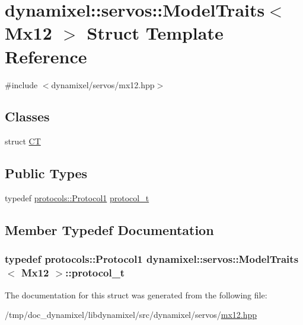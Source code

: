 \hypertarget{structdynamixel_1_1servos_1_1_model_traits_3_01_mx12_01_4}{}\section{dynamixel\+:\+:servos\+:\+:Model\+Traits$<$ Mx12 $>$ Struct Template Reference}
\label{structdynamixel_1_1servos_1_1_model_traits_3_01_mx12_01_4}


{\ttfamily \#include $<$dynamixel/servos/mx12.\+hpp$>$}

\subsection*{Classes}
\begin{DoxyCompactItemize}
\item 
struct \hyperlink{structdynamixel_1_1servos_1_1_model_traits_3_01_mx12_01_4_1_1_c_t}{C\+T}
\end{DoxyCompactItemize}
\subsection*{Public Types}
\begin{DoxyCompactItemize}
\item 
typedef \hyperlink{classdynamixel_1_1protocols_1_1_protocol1}{protocols\+::\+Protocol1} \hyperlink{structdynamixel_1_1servos_1_1_model_traits_3_01_mx12_01_4_a6bf24d609897d873140d1842e725fd47}{protocol\+\_\+t}
\end{DoxyCompactItemize}


\subsection{Member Typedef Documentation}
\hypertarget{structdynamixel_1_1servos_1_1_model_traits_3_01_mx12_01_4_a6bf24d609897d873140d1842e725fd47}{}
\subsubsection[{protocol\+\_\+t}]{\setlength{\rightskip}{0pt plus 5cm}typedef {\bf protocols\+::\+Protocol1} {\bf dynamixel\+::servos\+::\+Model\+Traits}$<$ {\bf Mx12} $>$\+::{\bf protocol\+\_\+t}}\label{structdynamixel_1_1servos_1_1_model_traits_3_01_mx12_01_4_a6bf24d609897d873140d1842e725fd47}


The documentation for this struct was generated from the following file\+:\begin{DoxyCompactItemize}
\item 
/tmp/doc\+\_\+dynamixel/libdynamixel/src/dynamixel/servos/\hyperlink{mx12_8hpp}{mx12.\+hpp}\end{DoxyCompactItemize}
